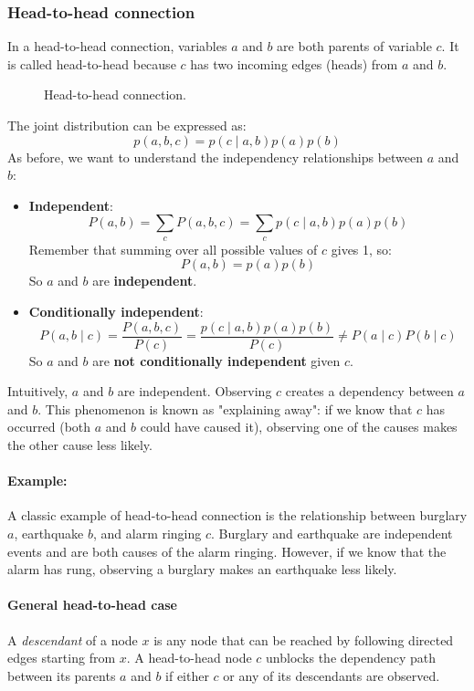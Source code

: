 \subsubsection{Head-to-head connection}
In a head-to-head connection, variables $a$ and $b$ are both parents of variable $c$.
It is called head-to-head because $c$ has two incoming edges (heads) from $a$ and $b$.
\begin{figure}[H]
\centering
    \caption{Head-to-head connection.}
\end{figure}
The joint distribution can be expressed as:
\[ p(a,b,c) = p(c\mid a,b) p(a) p(b) \]
As before, we want to understand the independency relationships between $a$ and $b$:
\begin{itemize}
    \item \textbf{Independent}:
    \[ P(a, b) = \sum_{c} P(a, b, c) = \sum_{c} p(c\mid a,b) p(a) p(b)\]
    Remember that summing over all possible values of $c$ gives 1, so:
    \[ P(a, b) = p(a) p(b) \]
    So $a$ and $b$ are \textbf{independent}.
    \item \textbf{Conditionally independent}:
    \[ P(a, b \mid c) = \frac{P(a, b, c)}{P(c)} = \frac{p(c\mid a,b) p(a) p(b)}{P(c)} \neq P(a \mid c) P(b \mid c) \]
    So $a$ and $b$ are \textbf{not conditionally independent} given $c$.
\end{itemize}
Intuitively, $a$ and $b$ are independent. Observing $c$ creates a dependency between $a$ and $b$.
This phenomenon is known as "explaining away": if we know that $c$ has occurred (both $a$ and $b$ could have caused it), 
observing one of the causes makes the other cause less likely.
\paragraph{Example:}
A classic example of head-to-head connection is the relationship between burglary $a$, earthquake $b$, and alarm ringing $c$.
Burglary and earthquake are independent events and are both causes of the alarm ringing.
However, if we know that the alarm has rung, observing a burglary makes an earthquake less likely.
\paragraph{General head-to-head case}
A \textit{descendant} of a node $x$ is any node that can be reached by following directed edges starting from $x$.
A head-to-head node $c$ unblocks the dependency path between its parents $a$ and $b$ if either $c$ or any of its descendants are observed.

